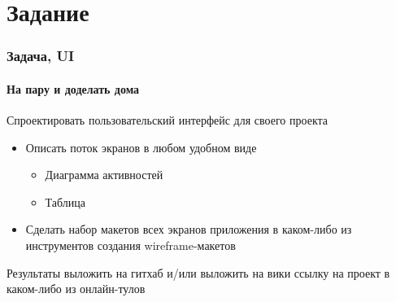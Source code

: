 \documentclass[xetex,mathserif,serif]{beamer}
\begin{document}
		\section{Задание}

		\begin{frame}
			\frametitle{Задача, UI}
			\framesubtitle{На пару и доделать дома}
			Спроектировать пользовательский интерфейс для своего проекта
			\begin{itemize} 
				\item Описать поток экранов в любом удобном виде
				\begin{itemize} 
					\item Диаграмма активностей
					\item Таблица
				\end{itemize} 
				\item Сделать набор макетов всех экранов приложения в каком-либо из инструментов создания wireframe-макетов 
			\end{itemize} 
			Результаты выложить на гитхаб и/или выложить на вики ссылку на проект в каком-либо из онлайн-тулов
		\end{frame}
\end{document}
